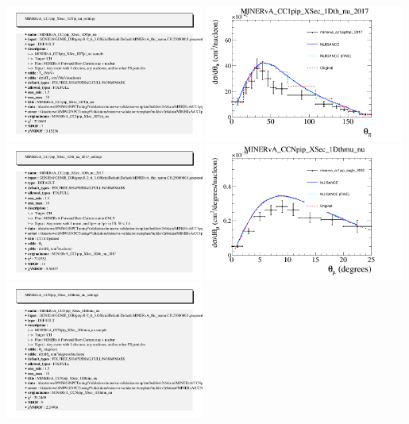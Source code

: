 \documentclass{article}
\begin{document}
\includegraphics[width=0.49\textwidth]{figures/minerva_cc1piptpi_eberly_info.png}
\centering
\includegraphics[width=0.49\textwidth]{figures/minerva_cc1pipthpi_2017_comp.png}
\includegraphics[width=0.49\textwidth]{figures/minerva_cc1pipthpi_2017_info.png}
\centering
\includegraphics[width=0.49\textwidth]{figures/minerva_cc1pip_angle_2016_comp.png}
\includegraphics[width=0.49\textwidth]{figures/minerva_cc1pip_angle_2016_info.png}
\end{document}
